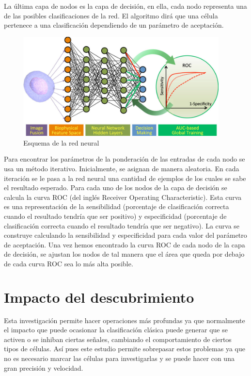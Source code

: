 \documentclass[a4paper, 12pt, UTF8]{article}
\begin{document}
La última capa de nodos es la capa de decisión, en ella, cada nodo representa una de las posibles clasificaciones de la red. El algoritmo dirá que una célula pertenece a una clasificación dependiendo de un parámetro de aceptación.

\begin{figure}[h!]
	\centering
	\includegraphics[width=0.95\textwidth]{neural}
	\caption{Esquema de la red neural}
	\label{fig:neural}
\end{figure}

Para encontrar los parámetros de la ponderación de las entradas de cada nodo se usa un método iterativo. Inicialmente, se asignan de manera aleatoria. En cada iteración se le pasa a la red neural una cantidad de ejemplos de los cuales se sabe el resultado esperado. Para cada uno de los nodos de la capa de decisión se calcula la curva ROC (del inglés Receiver Operating Characteristic). Esta curva es una representación de la sensibilidad (porcentaje de clasificación correcta cuando el resultado tendría que ser positivo) y especificidad (porcentaje de clasificación correcta cuando el resultado tendría que ser negativo). La curva se construye calculando la sensibilidad y especificidad para cada valor del parámetro de aceptación. Una vez hemos encontrado la curva ROC de cada nodo de la capa de decisión,  se ajustan los nodos de tal manera que el área que queda por debajo de cada curva ROC sea lo más alta posible.


\section{Impacto del descubrimiento}

Esta investigación permite hacer operaciones más profundas ya que normalmente el impacto que puede ocasionar la clasificación clásica puede generar que se activen o se inhiban ciertas señales, cambiando el comportamiento de ciertos tipos de células. Así pues este estudio permite sobrepasar estos problemas ya que no es necesario marcar las células para investigarlas y se puede hacer con una gran precisión y velocidad.
\end{document}
